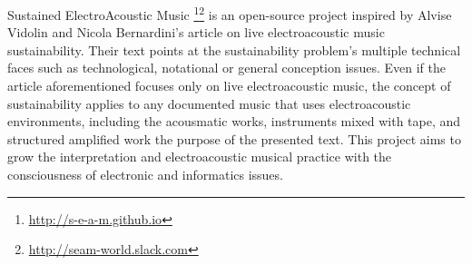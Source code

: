 \newcommand{\mylanguages}{italian,english} %
\newcommand{\mytitle}{SEAM PROJECT}
\newcommand{\mysubtitle}{Sustained ElectroAcoustic Music}
\newcommand{\authorone}{Giovanni Michelangelo D'Urso}
\newcommand{\institutione}{Conservatorio S. Cecilia of Roma}
\newcommand{\emailone}{giovannimick94 @ gmail.com}
\newcommand{\phoneone}{}
\newcommand{\authortwo}{Giuseppe Silvi}
\newcommand{\institutiontwo}{Conservatorio N. Piccinni of Bari}
\newcommand{\emailtwo}{silvi.giuseppe @ docenticonsba.it} %
\newcommand{\phonetwo}{}
\newcommand{\authorthree}{Davide Tedesco}
\newcommand{\institutionthree}{Conservatorio S. Cecilia of Roma}
\newcommand{\emailthree}{me @ davidetedesco.it} %
\newcommand{\phonethree}{}


\maketitle
\thispagestyle{empty}

Sustained ElectroAcoustic Music
\footnote{\url{http://s-e-a-m.github.io}}\footnote{\url{http://seam-world.slack.com}}
is an open-source project inspired by Alvise Vidolin and Nicola Bernardini's
article \cite{bevi05} on live electroacoustic music sustainability. Their text
points at the sustainability problem's multiple technical faces such as
technological, notational or general conception issues. Even if the article
aforementioned focuses only on live electroacoustic music, the concept of
sustainability applies to any documented music that uses electroacoustic
environments, including the acousmatic works, instruments mixed with tape, and
structured amplified work the purpose of the presented text. This project aims
to grow the interpretation and electroacoustic musical practice with the
consciousness of electronic and informatics issues.


